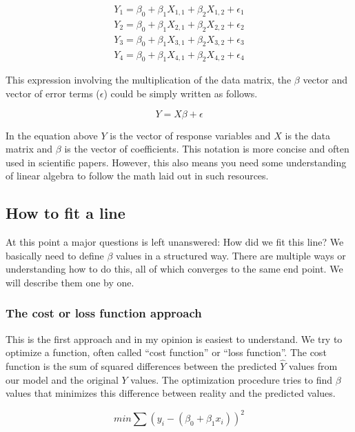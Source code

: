 \documentclass[12pt,]{krantz}
\theoremstyle{definition}
\theoremstyle{definition}
\theoremstyle{definition}
\theoremstyle{remark}
\begin{document}
\[
\begin{aligned}
Y_1= \beta_0+\beta_1X_{1,1}+\beta_2X_{1,2} +\epsilon_1 \\
Y_2= \beta_0+\beta_1X_{2,1}+\beta_2X_{2,2} +\epsilon_2 \\
Y_3= \beta_0+\beta_1X_{3,1}+\beta_2X_{3,2} +\epsilon_3 \\
Y_4= \beta_0+\beta_1X_{4,1}+\beta_2X_{4,2} +\epsilon_4 
\end{aligned}
\]

This expression involving the multiplication of the data matrix, the
\(\beta\) vector and vector of error terms (\(\epsilon\)) could be
simply written as follows.

\[Y=X\beta + \epsilon\]

In the equation above \(Y\) is the vector of response variables and
\(X\) is the data matrix and \(\beta\) is the vector of coefficients.
This notation is more concise and often used in scientific papers.
However, this also means you need some understanding of linear algebra
to follow the math laid out in such resources.

\hypertarget{how-to-fit-a-line}{%
\subsection{How to fit a line}\label{how-to-fit-a-line}}

At this point a major questions is left unanswered: How did we fit this
line? We basically need to define \(\beta\) values in a structured way.
There are multiple ways or understanding how to do this, all of which
converges to the same end point. We will describe them one by one.

\hypertarget{the-cost-or-loss-function-approach}{%
\subsubsection{The cost or loss function
approach}\label{the-cost-or-loss-function-approach}}

This is the first approach and in my opinion is easiest to understand.
We try to optimize a function, often called ``cost function'' or ``loss
function''. The cost function is the sum of squared differences between
the predicted \(\hat{Y}\) values from our model and the original \(Y\)
values. The optimization procedure tries to find \(\beta\) values that
minimizes this difference between reality and the predicted values.

\[min \sum{(y_i-(\beta_0+\beta_1x_i))^2}\]
\end{document}
